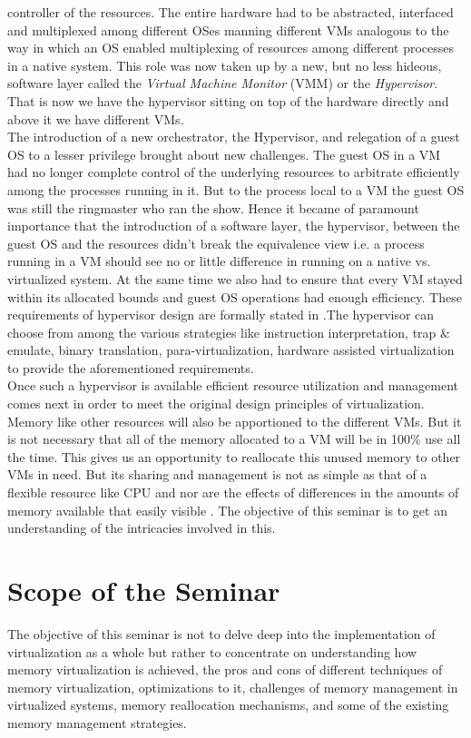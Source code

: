 controller of the resources. The entire hardware had to be abstracted, interfaced and multiplexed
among different OSes manning different VMs analogous to the way in which an OS enabled
multiplexing of resources among different processes in a native system. This role was now taken up
by a new, but no less hideous, software layer called the \textit{Virtual Machine Monitor} (VMM) or
the \textit{Hypervisor}. That is now we have the hypervisor sitting on top of the hardware 
directly and above it we have different VMs.\\
The introduction of a new orchestrator, the Hypervisor, and relegation of a guest OS to a lesser
privilege brought about new challenges. The guest OS in a VM had no longer complete control of the
underlying resources to arbitrate efficiently among the processes running in it. But to the
process local to a VM the guest OS was still the ringmaster who ran the show. Hence it became of
paramount importance that the introduction of a software layer, the hypervisor, between the guest
OS and the resources didn't break the equivalence view  i.e. a process running in a VM should see
no or little difference in running on a native vs. virtualized system. At the same time we also
had to ensure that every VM stayed within its allocated bounds and guest OS operations had enough
efficiency. These requirements of hypervisor design are formally stated in 
\cite{popek1974formal}.The hypervisor can choose from among the various strategies like
instruction interpretation, trap \& emulate, binary translation, para-virtualization, hardware
assisted virtualization to provide the aforementioned requirements.\\
Once such a hypervisor is available efficient resource utilization and management comes next in
order to meet the original design principles of virtualization. Memory like other
resources will also be apportioned to the different VMs. But it is not necessary that all  of the
memory allocated to a VM will be in 100\% use all the time. This gives us an opportunity to
reallocate this unused memory to other VMs in need. But its sharing and management is not as
simple as that of a flexible resource like CPU and nor are the effects of differences in the
amounts of memory available that easily visible \citep{hwang2013mortar}. The objective of this
seminar is to get an understanding of the intricacies involved in this. 

\section{Scope of the Seminar} \label{scope}
The objective of this seminar is not to delve deep into the implementation of virtualization as a
whole but rather to concentrate on understanding how memory virtualization is achieved, the pros and cons of different techniques of memory virtualization, optimizations to it, challenges of memory management in virtualized systems, memory reallocation mechanisms, and some of the existing memory management strategies.     

